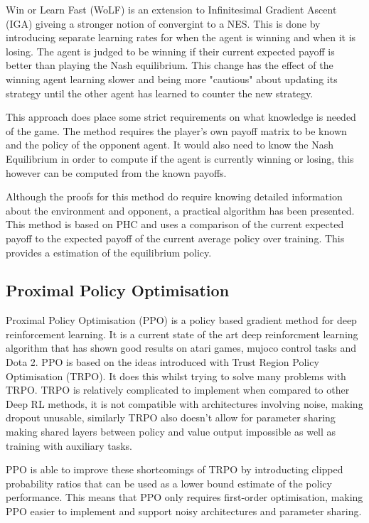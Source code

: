 \documentclass[conference]{IEEEtran}
\begin{document}
Win or Learn Fast (WoLF) is an extension to Infinitesimal Gradient Ascent (IGA)\cite{singh2000nash} giveing a stronger notion of convergint to a NES. This is done by introducing separate learning rates for when the agent is winning and when it is losing. The agent is judged to be winning if their current expected payoff is better than playing the Nash equilibrium. This change has the effect of the winning agent learning slower and being more "cautious" about updating its strategy until the other agent has learned to counter the new strategy.

This approach does place some strict requirements on what knowledge is needed of the game. The method requires the player's own payoff matrix to be known and the policy of the opponent agent. It would also need to know the Nash Equilibrium in order to compute if the agent is currently winning or losing, this however can be computed from the known payoffs.

Although the proofs for this method do require knowing detailed information about the environment and opponent, a practical algorithm has been presented. This method is based on PHC and uses a comparison of the current expected payoff to the expected payoff of the current average policy over training. This provides a estimation of the equilibrium policy.

\subsection{Proximal Policy Optimisation}

Proximal Policy Optimisation (PPO) is a policy based gradient method for deep reinforcement learning. It is a current state of the art deep reinforcment learning algorithm that has shown good results on atari games, mujoco control tasks\cite{schulman2017proximal} and Dota 2\cite{OpenAI_dota}. PPO is based on the ideas introduced with Trust Region Policy Optimisation (TRPO)\cite{schulman2015trust}. It does this whilst trying to solve many problems with TRPO. TRPO is relatively complicated to implement when compared to other Deep RL methods, it is not compatible with architectures involving noise, making dropout unusable, similarly TRPO also doesn't allow for parameter sharing making shared layers between policy and value output impossible as well as training with auxiliary tasks.

PPO is able to improve these shortcomings of TRPO by introducting clipped probability ratios that can be used as a lower bound estimate of the policy performance. This means that PPO only requires first-order optimisation, making PPO easier to implement and support noisy architectures and parameter sharing. 
\end{document}

